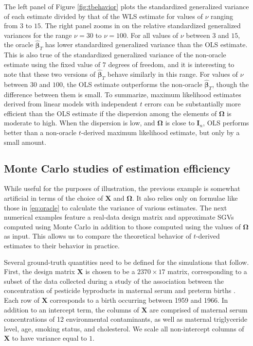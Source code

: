\documentclass[12pt]{article}
\newcommand{\bl}[1]{{\mathbf #1}}
\newcommand{\bs}[1]{\boldsymbol #1}
\begin{document}
The left panel of Figure \ref{fig:tbehavior} plots the standardized generalized variance of each estimate divided by that of the WLS estimate for values of $\nu$ ranging from $3$ to $15$. The right panel zooms in on the relative standardized generalized variances for the range $\nu = 30$ to $\nu = 100$. For all values of $\nu$ between $3$ and $15$, the oracle $\hat{\bs{\beta}}_T$ has lower standardized generalized variance than the OLS estimate. This is also true of the standardized generalized variance of the non-oracle estimate using the fixed value of $7$ degrees of freedom, and it is interesting to note that these two versions of $\hat{\bs{\beta}}_T$ behave similarly in this range. For values of $\nu$ between $30$ and $100$, the OLS estimate outperforms the non-oracle $\hat{\bs{\beta}}_T$, though the difference between them is small. To summarize, maximum likelihood estimates derived from linear models with independent $t$ errors can be substantially more efficient than the OLS estimate if the dispersion among the elements of $\bs{\Omega}$ is moderate to high. When the dispersion is low, and $\bs{\Omega}$ is close to $\bl{I}_n$, OLS performs better than a non-oracle $t$-derived maximum likelihood estimate, but only by a small amount.

\subsection{Monte Carlo studies of estimation efficiency}

While useful for the purposes of illustration, the previous example is somewhat artificial in terms of the choice of $\bl{X}$ and $\bs{\Omega}$. It also relies only on formulae like those in \eqref{eq:oracle} to calculate the variance of various estimates. The next numerical examples feature a real-data design matrix and approximate SGVs computed using Monte Carlo in addition to those computed using the values of $\bs{\Omega}$ as input. This allows us to compare the theoretical behavior of $t$-derived estimates to their behavior in practice.

Several ground-truth quantities need to be defined for the simulations that follow. First, the design matrix $\bl{X}$ is chosen to be a $2370 \times 17$ matrix, corresponding to a subset of the data collected during a study of the association between the concentration of pesticide byproducts in maternal serum and preterm births \citep{longnecker_association_2001}. Each row of $\bl{X}$ corresponds to a birth occurring between 1959 and 1966. In addition to an intercept term, the columns of $\bl{X}$ are comprised of maternal serum concentrations of 12 environmental contaminants, as well as maternal triglyceride level, age, smoking status, and cholesterol. We scale all non-intercept columns of $\bl{X}$ to have variance equal to $1$.
\end{document}
